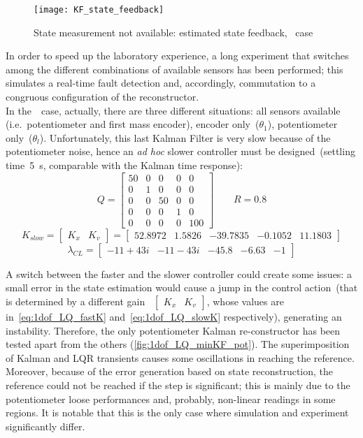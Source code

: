 \begin{figure*}
	\centering
	\texttt{[image: KF\_state\_feedback]}
	\caption{State measurement not available: estimated state feedback, \onedof\ case}
	\label{fig:KF_state_feedback}
\end{figure*}

In order to speed up the laboratory experience, a long experiment that switches among the different combinations of available sensors has been performed; this simulates a real-time fault detection and, accordingly, commutation to a congruous configuration of the reconstructor. \\
\newpage
In the~\onedof\ case, actually, there are three different situations: all sensors available (i.e.~potentiometer and first mass encoder), encoder only~($\theta_1$), potentiometer only~($\theta_l$). Unfortunately, this last Kalman Filter is very slow because of the potentiometer noise, hence an \textit{ad hoc} slower controller must be designed~(settling time~5~s, comparable with the Kalman time response):
\[
	Q =
	\begin{bmatrix}
		50 & 0 & 0 & 0 & 0 \\
		0 & 1 & 0 & 0 & 0 \\
		0 & 0 & 50 & 0 & 0 \\
		0 & 0 & 0 & 1 & 0 \\
		0 & 0 & 0 & 0 & 100
	\end{bmatrix}
	\qquad
	R = 0.8
\]
\begin{equation}
	K_{slow} =
	\left[
	\begin{array}{c|c}
		K_x & K_v
	\end{array}
	\right]
	=
	\left[
	\begin{array}{cccc|c}
		52.8972 & 1.5826 & -39.7835 & -0.1052 & 11.1803
	\end{array}
	\right]
	\label{eq:1dof_LQ_slowK}
\end{equation}
\begin{equation}
\lambda_{CL} =
\begin{bmatrix}
	-11+43i & -11-43i & -45.8 & -6.63 & -1 
\end{bmatrix}
\end{equation}

A switch between the faster and the slower controller could create some issues: a small error in the state estimation would cause a jump in the control action~(that is determined by a different gain~
$
\left[
	\begin{array}{c|c}
		K_x & K_v
	\end{array}
\right]
$, whose values are in~\cref{eq:1dof_LQ_fastK} and~\cref{eq:1dof_LQ_slowK} respectively), generating an instability. Therefore, the only potentiometer Kalman re-constructor has been tested apart from the others (\cref{fig:1dof_LQ_minKF_pot}). The superimposition of Kalman and LQR transients causes some oscillations in reaching the reference. Moreover, because of the error generation based on state reconstruction, the reference could not be reached if the step is significant; this is mainly due to the potentiometer loose performances and, probably, non-linear readings in some regions. It is notable that this is the only case where simulation and experiment significantly differ.

